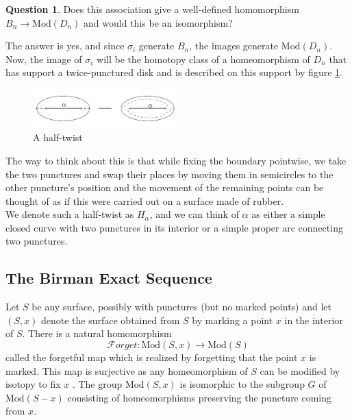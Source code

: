 \documentclass[reqno]{amsart}
\theoremstyle{definition}
\newtheorem{question}[theorem]{Question}
\theoremstyle{remark}
\newcommand{\Mod}{{\mathrm{Mod}}}
\newcommand{\Forget}{{\mathcal{F}}orget}
\begin{document}
\begin{question}\label{question-1}
    Does this association give a well-defined homomorphism
    $B_n \to \Mod(D_n) $ and would this be an isomorphism?
\end{question}

The answer is yes, and since $\sigma_i$ generate
$B_n$, the images generate $\Mod(D_n)$. Now, the
image of $\sigma_i$ will be the
homotopy class of a homeomorphism
of $D_n$ that has support a twice-punctured disk and is
described on this support by figure \ref{fig:half-twist-png}.

\begin{figure}[htpb]
    \centering
    \includegraphics[width=0.5\textwidth]{half-twist.png}
    \caption{A half-twist}
    \label{fig:half-twist-png}
\end{figure}

The way to think about this is that while fixing the boundary
pointwise, we take the two punctures and swap their places
by moving them in semicircles to the other puncture's position and
the movement of the remaining points can be
thought of as if this were carried out on
a surface made of rubber.\\


We denote such a half-twist as $H_{\alpha}$, and we
can think of $\alpha$ as either a simple closed
curve with two punctures in its interior or a simple
proper arc connecting two punctures.


\subsection{The Birman Exact Sequence}

Let $S$ be any surface, possibly with punctures (but no 
marked points) and let
$\left( S, x \right) $ denote the surface obtained
from $S$ by marking a point $x$ in the
interior of $S$. There is a natural
homomorphism
\[
\Forget \colon \Mod \left( S, x \right) \to \Mod(S)
\] 
called the forgetful map which is realized by forgetting
that the point $x$ is marked. This map is
surjective as any homeomorphism of $S$ can
be modified by isotopy to fix $x$ . The
group $\Mod(S,x)$ is isomorphic to the
subgroup $G$ of $\Mod \left( S - x \right) $ 
consisting of homeomorphisms preserving the
puncture coming from $x$.
\end{document}
